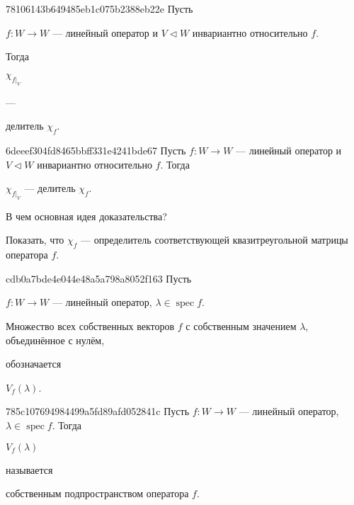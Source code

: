 \begin{note}{78106143b649485eb1c075b2388eb22e}
    Пусть \begin{icloze}{3}\( f : W \to W \) --- линейный оператор и \( V \triangleleft W \) инвариантно относительно \( f \).\end{icloze}
    Тогда
    \begin{center}
        \begin{icloze}{2}\( \chi_{f|_V} \)\end{icloze} --- \begin{icloze}{1}делитель \( \chi_f \).\end{icloze}
    \end{center}
\end{note}

\begin{note}{6deeef304fd8465bbff331e4241bde67}
    Пусть \( f : W \to W \) --- линейный оператор и \( V \triangleleft W \) инвариантно относительно \( f \).
    Тогда
    \begin{center}
        \( \chi_{f|_V} \) --- делитель \( \chi_f \).
    \end{center}

    В чем основная идея доказательства?

    \begin{cloze}{1}
        Показать, что \( \chi_f \) --- определитель соответствующей квазитреугольной матрицы оператора \( f \).
    \end{cloze}
\end{note}

\begin{note}{cdb0a7bde4e044e48a5a798a8052f163}
    Пусть \begin{icloze}{3}\( f : W \to W \) --- линейный оператор, \( \lambda \in \operatorname{spec} f \).\end{icloze}
    \begin{icloze}{1}Множество всех собственных векторов \( f \) с собственным значением \( \lambda \), объединённое с нулём,\end{icloze} обозначается \begin{icloze}{2}\( V_{f} (\lambda) \).\end{icloze}
\end{note}

\begin{note}{785c107694984499a5fd89afd052841c}
    Пусть \( f : W \to W \) --- линейный оператор, \( \lambda \in \operatorname{spec} f \).
    Тогда \begin{icloze}{2}\( V_f(\lambda) \)\end{icloze} называется \begin{icloze}{1}собственным подпространством оператора \( f \).\end{icloze}
\end{note}

